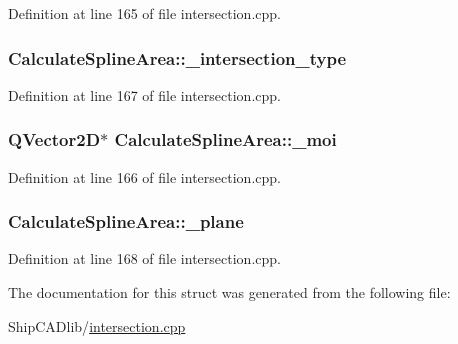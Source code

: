 Definition at line 165 of file intersection.\-cpp.

\hypertarget{structCalculateSplineArea_aae716b66f114f0217e68efc79ca9cc91}{
\subsubsection[{\-\_\-intersection\-\_\-type}]{ Calculate\-Spline\-Area\-::\-\_\-intersection\-\_\-type}}\label{structCalculateSplineArea_aae716b66f114f0217e68efc79ca9cc91}


Definition at line 167 of file intersection.\-cpp.

\hypertarget{structCalculateSplineArea_a5d4eebaf188d12a2f30ed7f28bf3d57f}{
\subsubsection[{\-\_\-moi}]{\setlength{\rightskip}{0pt plus 5cm}Q\-Vector2\-D$\ast$ Calculate\-Spline\-Area\-::\-\_\-moi}}\label{structCalculateSplineArea_a5d4eebaf188d12a2f30ed7f28bf3d57f}


Definition at line 166 of file intersection.\-cpp.

\hypertarget{structCalculateSplineArea_ab6c7f0e103a21db017e7330a31e9f984}{
\subsubsection[{\-\_\-plane}]{ Calculate\-Spline\-Area\-::\-\_\-plane}}\label{structCalculateSplineArea_ab6c7f0e103a21db017e7330a31e9f984}


Definition at line 168 of file intersection.\-cpp.



The documentation for this struct was generated from the following file\-:\begin{DoxyCompactItemize}
\item 
Ship\-C\-A\-Dlib/\hyperlink{intersection_8cpp}{intersection.\-cpp}\end{DoxyCompactItemize}
